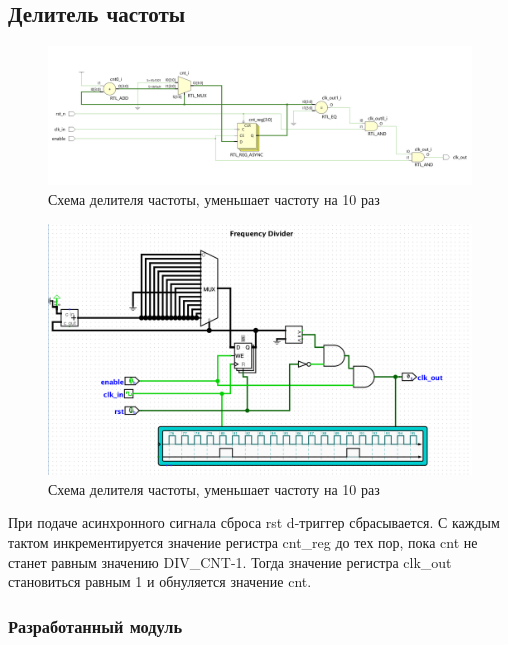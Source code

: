 \documentclass[12pt,onecolumn]{article}
\begin{document}
\subsection{Делитель частоты}
\begin{figure}[H]
  \centering
  \includegraphics[width=\textwidth]{image/freq-div.png}
  \caption{Схема делителя частоты, уменьшает частоту на 10 раз}
\end{figure}
\begin{figure}[H]
    \centering
    \includegraphics[width=\textwidth]{image/frequency-div.png}
    \caption{Схема делителя частоты, уменьшает частоту на 10 раз}
  \end{figure}

При подаче асинхронного сигнала сброса rst d-триггер сбрасывается.
С каждым тактом инкрементируется значение регистра cnt\_reg до тех пор, пока cnt не станет равным значению DIV\_CNT-1. 
Тогда значение регистра clk\_out становиться равным 1 и обнуляется значение cnt.
\subsubsection{Разработанный модуль}

\end{document}
